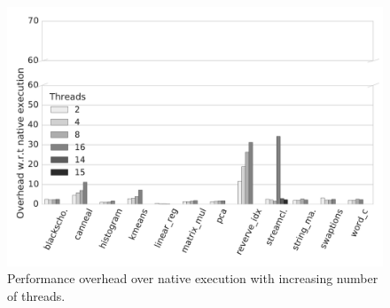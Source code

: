 
\begin{figure}[t]
\centering
\includegraphics[scale=0.25]{figure/benchmarks/times-XY_with_Intel_PT.pdf}
\caption{Performance overhead  over native execution with increasing number of threads.}
\label{fig:overheads}
\end{figure}
